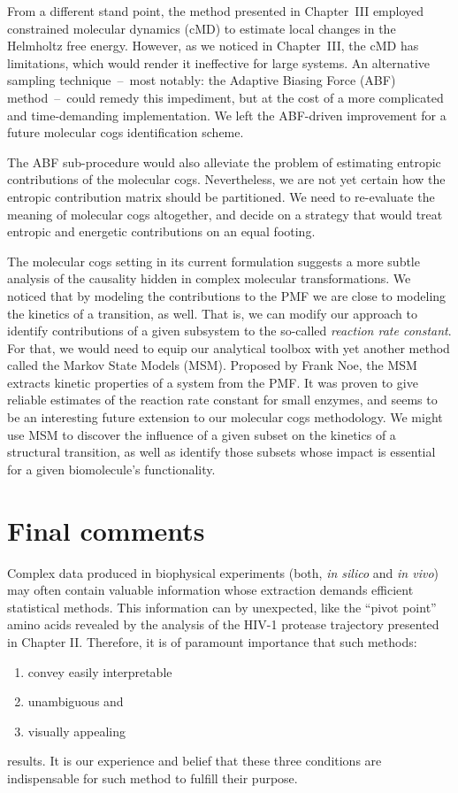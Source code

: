 \documentclass[a4paper,11pt,twoside]{book}%
\begin{document}
From a different stand point, the method presented in Chapter~III employed constrained molecular dynamics (cMD) to estimate local changes in the Helmholtz free energy.
However, as we noticed in Chapter~III, the cMD has limitations, which would render it ineffective for large systems.
An alternative sampling technique~--~most notably: the Adaptive Biasing Force (ABF) method~--~could remedy this impediment, but at the cost of a more complicated and time-demanding implementation.
We left the ABF-driven improvement for a future molecular cogs identification scheme.

The ABF sub-procedure would also alleviate the problem of estimating entropic contributions of the molecular cogs.
Nevertheless, we are not yet certain how the entropic contribution matrix should be partitioned.
We need to re-evaluate the meaning of molecular cogs altogether, and decide on a strategy that would treat entropic and energetic contributions on an equal footing.

The molecular cogs setting in its current formulation suggests a more subtle analysis of the causality hidden in complex molecular transformations.
We noticed that by modeling the contributions to the PMF we are close to modeling the kinetics of a transition, as well.
That is, we can modify our approach to identify contributions of a given subsystem to the so-called \emph{reaction rate constant}.
For that, we would need to equip our analytical toolbox with yet another method called the Markov State Models (MSM).
Proposed by Frank Noe, the MSM extracts kinetic properties of a system from the PMF.
It was proven to give reliable estimates of the reaction rate constant for small enzymes, and seems to be an interesting future extension to our molecular cogs methodology.
We might use MSM to discover the influence of a given subset on the kinetics of a structural transition, as well as identify those subsets whose impact is essential for a given biomolecule's functionality.

\section{Final comments}

Complex data produced in biophysical experiments (both, \emph{in silico} and \emph{in vivo}) may often contain valuable information whose extraction demands efficient statistical methods.
This information can by unexpected, like the ``pivot point'' amino acids revealed by the analysis of the HIV-1 protease trajectory presented in Chapter II.
Therefore, it is of paramount importance that such methods:
\begin{enumerate}
 \item convey easily interpretable
 \item unambiguous and
 \item visually appealing
\end{enumerate}
results.
It is our experience and belief that these three conditions are indispensable for such method to fulfill their purpose.
\end{document}
